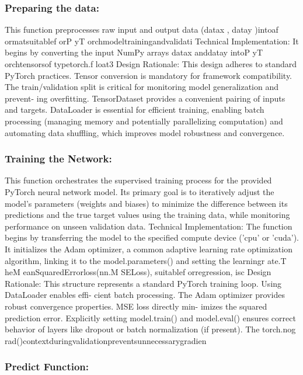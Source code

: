 \documentclass{article}
\begin{document}
\subsubsection{Preparing the data:}

This function preprocesses raw input and output data (datax , datay )intoaf ormatsuitablef orP yT orchmodeltrainingandvalidati
Technical Implementation: It begins by converting the input NumPy arrays datax anddatay intoP yT orchtensorsof typetorch.f loat3
Design Rationale: This design adheres to standard PyTorch practices. Tensor conversion is mandatory for
framework compatibility. The train/validation split is critical for monitoring model generalization and prevent-
ing overfitting. TensorDataset provides a convenient pairing of inputs and targets. DataLoader is essential for
efficient training, enabling batch processing (managing memory and potentially parallelizing computation) and
automating data shuffling, which improves model robustness and convergence.\\

\subsubsection{Training the Network:}

This function orchestrates the supervised training process for the provided PyTorch neural network model. Its
primary goal is to iteratively adjust the model’s parameters (weights and biases) to minimize the difference
between its predictions and the true target values using the training data, while monitoring performance on
unseen validation data.
Technical Implementation: The function begins by transferring the model to the specified compute device (’cpu’
or ’cuda’). It initializes the Adam optimizer, a common adaptive learning rate optimization algorithm, linking it
to the model.parameters() and setting the learningr ate.T heM eanSquaredErrorloss(nn.M SELoss), suitablef orregression, isc
Design Rationale: This structure represents a standard PyTorch training loop. Using DataLoader enables effi-
cient batch processing. The Adam optimizer provides robust convergence properties. MSE loss directly min-
imizes the squared prediction error. Explicitly setting model.train() and model.eval() ensures correct behavior of
layers like dropout or batch normalization (if present). The torch.nog rad()contextduringvalidationpreventsunnecessarygradien\\


\subsubsection{Predict Function:}
\end{document}
